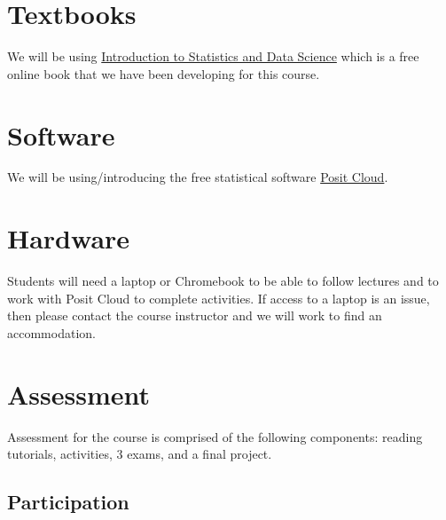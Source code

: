 \documentclass[
  letterpaper,
  DIV=11,
  numbers=noendperiod]{scrreprt}
\begin{document}
\hypertarget{textbooks}{%
\section*{Textbooks}\label{textbooks}}


We will be using
\href{https://nustat.github.io/intro-stat-data-sci/}{Introduction to
Statistics and Data Science} which is a free online book that we have
been developing for this course.

\hypertarget{software}{%
\section*{Software}\label{software}}


We will be using/introducing the free statistical software
\href{https://posit.cloud/}{Posit Cloud}.

\hypertarget{hardware}{%
\section*{Hardware}\label{hardware}}


Students will need a laptop or Chromebook to be able to follow lectures
and to work with Posit Cloud to complete activities. If access to a
laptop is an issue, then please contact the course instructor and we
will work to find an accommodation.

\hypertarget{assessment}{%
\section*{Assessment}\label{assessment}}


Assessment for the course is comprised of the following components:
reading tutorials, activities, 3 exams, and a final project.

\hypertarget{participation}{%
\subsection*{Participation}\label{participation}}
\end{document}
